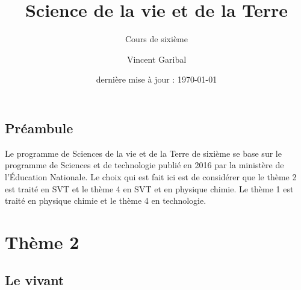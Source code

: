 \documentclass{Cours}
\title{Science de la vie et de la Terre}
\subtitle{Cours de sixième}
\author{Vincent Garibal}
\date{dernière mise à jour : \today}
\begin{document}
\frontmatter

\maketitle

\tableofcontents

\chapter{Préambule}

Le programme de Sciences de la vie et de la Terre de sixième se base sur le programme de Sciences et de technologie publié en 2016 par la ministère de l'Éducation Nationale. Le choix qui est fait ici est de considérer que le thème 2 est traité en SVT et le thème 4 en SVT et en physique chimie. Le thème 1 est traité en physique chimie et le thème 4 en technologie.

\mainmatter

\part{Thème 2}

\chapter{Le vivant}


\end{document}
